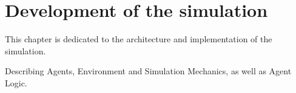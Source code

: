 \chapter{Development of the simulation}
This chapter is dedicated to the architecture and implementation of the simulation.

Describing Agents, Environment and Simulation Mechanics, as well as Agent Logic.
